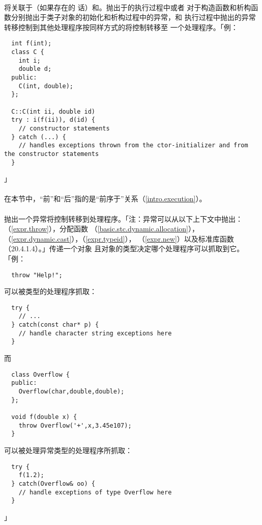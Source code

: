 \paragraph{}
将关联于（如果存在的
话）和。抛出于的执行过程中或者
对于构造函数和析构函数分别抛出于类子对象的初始化和析构过程中的异常，和
执行过程中抛出的异常转移控制到其他处理程序按同样方式的将控制转移至
一个处理程序。「例：
\begin{lstlisting}
  int f(int);
  class C {
    int i;
    double d;
  public:
    C(int, double);
  };

  C::C(int ii, double id)
  try : i(f(ii)), d(id) {
    // constructor statements
  } catch (...) {
    // handles exceptions thrown from the ctor-initializer and from the constructor statements
  }
\end{lstlisting}」

\paragraph{}
在本节中，``前''和``后''指的是``前序于''关系（\ref{intro.execution}）。

\paragraph{}
抛出一个异常将控制转移到处理程序。「注：异常可以从以下上下文中抛出：
（\ref{expr.throw}），分配函数
（\ref{basic.stc.dynamic.allocation}），
（\ref{expr.dynamic.cast}），（\ref{expr.typeid}），
（\ref{expr.new}）以及标准库函数（20.4.1.4）。」传递一个对象
且对象的类型决定哪个处理程序可以抓取到它。「例：
\begin{lstlisting}
  throw "Help!";
\end{lstlisting}
可以被类型的处理程序抓取：
\begin{lstlisting}
  try {
    // ...
  } catch(const char* p) {
    // handle character string exceptions here
  }
\end{lstlisting}
而
\begin{lstlisting}
  class Overflow {
  public:
    Overflow(char,double,double);
  };

  void f(double x) {
    throw Overflow('+',x,3.45e107);
  }
\end{lstlisting}
可以被处理异常类型的处理程序所抓取：
\begin{lstlisting}
  try {
    f(1.2);
  } catch(Overflow& oo) {
    // handle exceptions of type Overflow here
  }
\end{lstlisting}」

